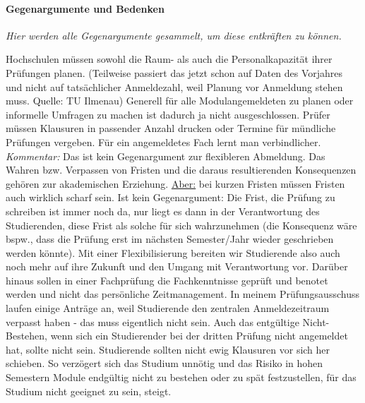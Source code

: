       \paragraph{Gegenargumente und Bedenken}
        \textit{Hier werden alle Gegenargumente gesammelt, um diese entkräften zu können.} \\
        \begin{outline}
          \1 Hochschulen müssen sowohl die Raum- als auch die Personalkapazität ihrer Prüfungen planen. (Teilweise passiert das jetzt schon auf Daten des Vorjahres und nicht auf tatsächlicher Anmeldezahl, weil Planung vor Anmeldung stehen muss. Quelle: TU Ilmenau)
            \2 Generell für alle Modulangemeldeten zu planen oder informelle Umfragen zu machen ist dadurch ja nicht ausgeschlossen.
          \1 Prüfer müssen Klausuren in passender Anzahl drucken oder Termine für mündliche Prüfungen vergeben.
          \1 Für ein angemeldetes Fach lernt man verbindlicher. \textit{Kommentar:} Das ist kein Gegenargument zur flexibleren Abmeldung.
          \1 Das Wahren bzw. Verpassen von Fristen und die daraus resultierenden Konsequenzen gehören zur akademischen Erziehung. \underline{Aber:} bei kurzen Fristen müssen Fristen auch wirklich scharf sein.
            \2 Ist kein Gegenargument: Die Frist, die Prüfung zu schreiben ist immer noch da, nur liegt es dann in der Verantwortung des Studierenden, diese Frist als solche für sich wahrzunehmen (die Konsequenz wäre bspw., dass die Prüfung erst im nächsten Semester/Jahr wieder geschrieben werden könnte). Mit einer Flexibilisierung bereiten wir Studierende also auch noch mehr auf ihre Zukunft und den Umgang mit Verantwortung vor. Darüber hinaus sollen in einer Fachprüfung die Fachkenntnisse geprüft und benotet werden und nicht das persönliche Zeitmanagement.
            \2 In meinem Prüfungsausschuss laufen einige Anträge an, weil Studierende den zentralen Anmeldezeitraum verpasst haben - das muss eigentlich nicht sein. Auch das entgültige Nicht-Bestehen, wenn sich ein Studierender bei der dritten Prüfung nicht angemeldet hat, sollte nicht sein.
          \1 Studierende sollten nicht ewig Klausuren vor sich her schieben. So verzögert sich das Studium unnötig und das Risiko in hohen Semestern Module endgültig nicht zu bestehen oder zu spät festzustellen, für das Studium nicht geeignet zu sein, steigt.
        \end{outline}
